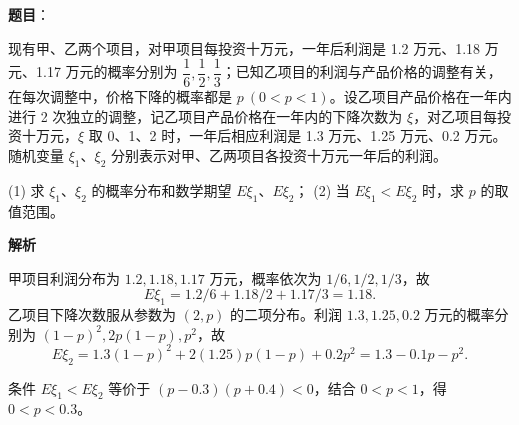 \begin{answer}

\textbf{题目}：

现有甲、乙两个项目，对甲项目每投资十万元，一年后利润是 1.2 万元、1.18 万元、1.17 万元的概率分别为 $\dfrac16,\dfrac12,\dfrac13$；已知乙项目的利润与产品价格的调整有关，在每次调整中，价格下降的概率都是 $p\ (0<p<1)$。设乙项目产品价格在一年内进行 2 次独立的调整，记乙项目产品价格在一年内的下降次数为 $\xi$，对乙项目每投资十万元，$\xi$ 取 0、1、2 时，一年后相应利润是 1.3 万元、1.25 万元、0.2 万元。随机变量 $\xi_1\text{、}\xi_2$ 分别表示对甲、乙两项目各投资十万元一年后的利润。

(1) 求 $\xi_1\text{、}\xi_2$ 的概率分布和数学期望 $E\xi_1\text{、}E\xi_2$；
(2) 当 $E\xi_1<E\xi_2$ 时，求 $p$ 的取值范围。

\textbf{解析}


甲项目利润分布为 $1.2,1.18,1.17$ 万元，概率依次为 $1/6,1/2,1/3$，故
\nopagebreak[4]
\[
E\xi_1=1.2/6+1.18/2+1.17/3=1.18.
\]
乙项目下降次数服从参数为 $(2,p)$ 的二项分布。利润 $1.3,1.25,0.2$ 万元的概率分别为 $(1-p)^2,2p(1-p),p^2$，故
\nopagebreak[4]
\[
E\xi_2=1.3(1-p)^2+2(1.25)p(1-p)+0.2p^2
=1.3-0.1p-p^2.
\]

条件 $E\xi_1<E\xi_2$ 等价于 $(p-0.3)(p+0.4)<0$，结合 $0<p<1$，得 $0<p<0.3$。



\end{answer}

